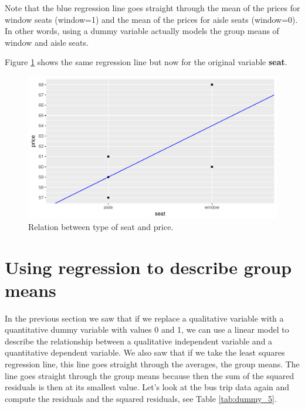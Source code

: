 \documentclass[]{report}\usepackage[]{graphicx}\usepackage[]{color}
\makeatletter
\def\maxwidth{ %
  \ifdim\Gin@nat@width>\linewidth
    \linewidth
  \else
    \Gin@nat@width
  \fi
}
\newenvironment{knitrout}{}{} %
\makeatother
\begin{document}
Note that the blue regression line goes straight through the mean of the prices for window seats (window=1) and the mean of the prices for aisle seats (window=0). In other words, using a dummy variable actually models the group means of window and aisle seats.

Figure \ref{fig:dummy_4} shows the same regression line but now for the original variable \textbf{seat}.

\begin{knitrout}
\color{fgcolor}\begin{figure}

{\centering \includegraphics[width=\maxwidth]{figure/dummy_4-1} 

}

\caption[Relation between type of seat and price]{Relation between type of seat and price.}\label{fig:dummy_4}
\end{figure}


\end{knitrout}



\section{Using regression to describe group means}

In the previous section we saw that if we replace a qualitative variable with a quantitative dummy variable with values 0 and 1, we can use a linear model to describe the relationship between a qualitative independent variable and a quantitative dependent variable. We also saw that if we take the least squares regression line, this line goes straight through the averages, the group means. The line goes straight through the group means because then the sum of the squared residuals is then at its smallest value.  Let's look at the bus trip data again and compute the residuals and the squared residuals, see Table \ref{tab:dummy_5}.
\end{document}
